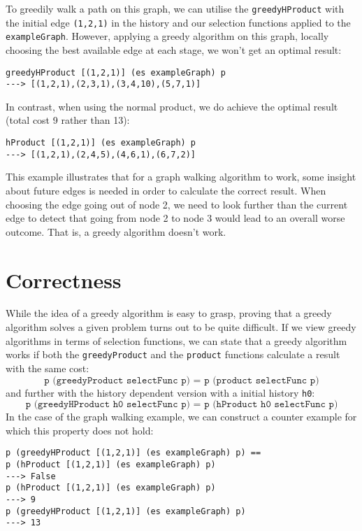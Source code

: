\documentclass[runningheads]{llncs}
\begin{document}
To greedily walk a path on this graph, we can utilise the \texttt{greedyHProduct} with the initial edge \texttt{(1,2,1)} in the history and our selection functions applied to the \texttt{exampleGraph}. However, applying a greedy algorithm on this graph, locally choosing the best available edge at each stage, we won't get an optimal result:
\begin{verbatim}
greedyHProduct [(1,2,1)] (es exampleGraph) p
---> [(1,2,1),(2,3,1),(3,4,10),(5,7,1)]
\end{verbatim}
In contrast, when using the normal product, we do achieve the optimal result (total cost 9 rather than 13):
\begin{verbatim}
hProduct [(1,2,1)] (es exampleGraph) p
---> [(1,2,1),(2,4,5),(4,6,1),(6,7,2)]
\end{verbatim}
This example illustrates that for a graph walking algorithm to work, some insight about future edges is needed in order to calculate the correct result. When choosing the edge going out of node 2, we need to look further than the current edge to detect that going from node 2 to node 3 would lead to an overall worse outcome. That is, a greedy algorithm doesn't work.
%
%
%
\section{Correctness}
While the idea of a greedy algorithm is easy to grasp, proving that a greedy algorithm solves a given problem turns out to be quite difficult. If we view greedy algorithms in terms of selection functions, we can state that a greedy algorithm works if both the \texttt{greedyProduct} and the \texttt{product} functions calculate a result with the same cost:
\begin{equation}
\texttt{p (greedyProduct selectFunc p) = p (product selectFunc p)}
\end{equation}
and further with the history dependent version with a initial history \texttt{h0}: 
\begin{equation}
\texttt{p (greedyHProduct h0 selectFunc p) = p (hProduct h0 selectFunc p)}
\end{equation}
In the case of the graph walking example, we can construct a counter example for which this property does not hold:
\begin{verbatim}
p (greedyHProduct [(1,2,1)] (es exampleGraph) p) == 
p (hProduct [(1,2,1)] (es exampleGraph) p)
---> False
p (hProduct [(1,2,1)] (es exampleGraph) p)
---> 9
p (greedyHProduct [(1,2,1)] (es exampleGraph) p)
---> 13
\end{verbatim}
%
%
%
\end{document}
